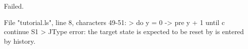 \runverbatimfalse
{}
\begin{RunVerbatimMsg}
Failed.
\end{RunVerbatimMsg}
\begin{RunVerbatimErr}
File "tutorial.ls", line 8, characters 49-51:
>          do y = 0 -> pre y + 1 until c continue S1
>                                                 ^^
Type error: the target state is expected to be reset by is entered by history.
\end{RunVerbatimErr}
